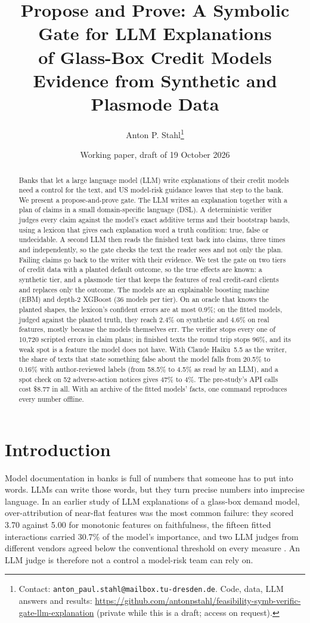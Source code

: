 \documentclass[11pt]{article}
\title{Propose and Prove: A Symbolic Gate for LLM Explanations\\of Glass-Box Credit Models\\[4pt]
\large Evidence from Synthetic and Plasmode Data}
\author{Anton P. Stahl\thanks{Contact: \texttt{anton\_paul.stahl@mailbox.tu-dresden.de}. Code, data, LLM answers and results:
\url{https://github.com/antonpstahl/feasibility-symb-verific-gate-llm-explanation} (private while this is a draft;
access on request).}}
\date{Working paper, draft of 19 October 2026}
\begin{document}
\maketitle

\begin{abstract}
\noindent
Banks that let a large language model (LLM) write explanations of their credit models need a control for the text,
and US model-risk guidance leaves that step to the bank. We present a propose-and-prove gate. The LLM writes an
explanation together with a plan of claims in a small domain-specific language (DSL). A deterministic verifier judges
every claim against the model's exact additive terms and their bootstrap bands, using a lexicon that gives each
explanation word a truth condition: true, false or undecidable. A second LLM then reads the finished text back into
claims, three times and independently, so the gate checks the text the reader sees and not only the plan. Failing
claims go back to the writer with their evidence. We test the gate on two tiers of credit data with a planted default
outcome, so the true effects are known: a synthetic tier, and a plasmode tier that keeps the features of real
credit-card clients and replaces only the outcome. The models are an explainable boosting machine (EBM) and depth-2
XGBoost (36 models per tier). On an oracle that knows the planted shapes, the lexicon's confident errors are at most
0.9\%; on the fitted models, judged against the planted truth, they
reach 2.4\% on synthetic and 4.6\% on real features, mostly because the models themselves err. The verifier stops
every one of 10,720 scripted errors in claim plans; in finished texts the round trip stops 96\%, and its weak spot is
a feature the model does not have. With Claude Haiku~5.5 as the writer, the share of texts that state something false
about the model falls from 20.5\% to 0.16\% with author-reviewed labels (from 58.5\% to 4.5\% as read by an LLM), and
a spot check on 52 adverse-action notices gives 47\% to 4\%. The pre-study's API calls cost \$8.77 in all. With an
archive of the fitted models' facts, one command reproduces every number offline.
\end{abstract}
\clearpage

\section{Introduction}

Model documentation in banks is full of numbers that someone has to put into words. LLMs can write those words, but
they turn precise numbers into imprecise language. In an earlier study of LLM explanations of a glass-box demand
model, over-attribution of near-flat features was the most common failure: they scored 3.70 against 5.00 for
monotonic features on faithfulness, the fifteen fitted interactions carried 30.7\% of the model's importance, and two
LLM judges from different vendors agreed below the conventional threshold on every measure
\citep{stahl2026seminar}. An LLM judge is therefore not a control a model-risk team can rely on.
\end{document}
